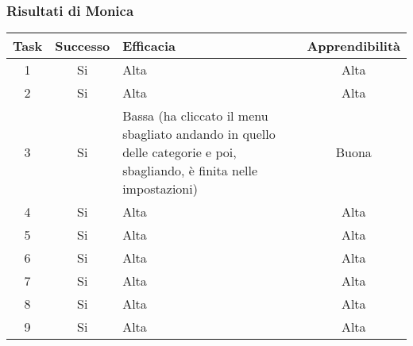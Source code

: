 \documentclass[../Report.tex]{subfiles}
\begin{document}
    \subsubsection{Risultati di Monica}
    \begin{table}[H]
        \begin{tabular}{|c|c|p{5cm}|c|}
            \hline
            Task & Successo & Efficacia & Apprendibilità \\
            \hline
            1 & Si & Alta & Alta \\
            \hline
            2 & Si & Alta & Alta  \\
            \hline
            3 & Si & Bassa (ha cliccato il menu sbagliato andando in quello delle categorie e poi, sbagliando, è finita nelle impostazioni)  & Buona  \\
            \hline
            4 & Si & Alta & Alta  \\
            \hline
            5 & Si & Alta & Alta  \\
            \hline
            6 & Si & Alta & Alta  \\
            \hline
            7 & Si & Alta & Alta  \\
            \hline
            8 & Si & Alta & Alta  \\
            \hline
            9 & Si & Alta & Alta  \\
            \hline
        \end{tabular}

        
    \end{table}
\end{document}
